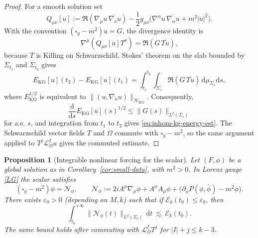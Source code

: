 \documentclass[11pt]{article}
\numberwithin{equation}{section}
\theoremstyle{plain}
\newtheorem{proposition}[theorem]{Proposition}
\theoremstyle{definition}
\theoremstyle{remark}
\newcommand{\dd}{\mathrm{d}}
\begin{document}
\begin{proof}
For a smooth solution set
\begin{equation}
 Q_{\mu\nu}[u]
 :=\Re(\nabla_\mu u\,\overline{\nabla_\nu u})
 -\frac12 g_{\mu\nu}\bigl(\nabla^\alpha u\,\overline{\nabla_\alpha u}+m^2|u|^2\bigr).
\end{equation}
With the convention \((\square_g-m^2)u=G\), the divergence identity is
\begin{equation}
 \nabla^\mu(Q_{\mu\nu}[u]T^\nu)=\Re(G\,\overline{T u}),
\end{equation}
because \(T\) is Killing on Schwarzschild.  Stokes' theorem on the slab bounded by \(\Sigma_{t_1}\) and \(\Sigma_{t_2}\) gives
\begin{equation}
 E_{\mathrm{KG}}[u](t_2)-E_{\mathrm{KG}}[u](t_1)
 =\int_{t_1}^{t_2}\int_{\Sigma_s}\Re(G\,\overline{T u})\,\dd\mu_{\Sigma_s}\dd s,
\end{equation}
where \(E_{\mathrm{KG}}^{1/2}\) is equivalent to \(\|(u,\nabla_nu)\|_{\mathcal H_{\mathrm{KG}}}\).  Consequently,
\begin{equation}
 \frac{\dd}{\dd s}E_{\mathrm{KG}}[u](s)^{1/2}
 \le \|G(s)\|_{L^2(\Sigma_s)}
\end{equation}
for a.e. \(s\), and integration from \(t_1\) to \(t_2\) gives \eqref{eq:inhom-kg-energy-est}.  The Schwarzschild vector fields \(T\) and \(\Omega\) commute with \(\square_g-m^2\), so the same argument applied to \(T^j\mathcal L_\Omega^Iu\) gives the commuted estimate.
\end{proof}

\begin{proposition}[Integrable nonlinear forcing for the scalar]\label{prop:integrable-forcing}
Let $(F,\phi)$ be a global solution as in Corollary~\ref{cor:small-data}, with $m^{2}>0$.
In Lorenz gauge \eqref{LG} the scalar satisfies
\begin{equation}\label{eq:phi-as-kg}
(\square_g-m^{2})\phi = \mathcal N_{\phi},
\qquad
\mathcal N_{\phi}:=2iA^{\mu}\nabla_{\mu}\phi + A^{\mu}A_{\mu}\phi + \bigl(\partial_{\bar\phi}P(\phi,\bar\phi)-m^{2}\phi\bigr).
\end{equation}
There exists $\varepsilon_0>0$ (depending on $M,k$) such that if $\mathcal E_k(t_0)\le\varepsilon_0$, then
\begin{equation}\label{eq:forcing-L1}
\int_{t_0}^{+\infty}\|\mathcal N_{\phi}(t)\|_{L^{2}(\Sigma_t)}\,\dd t
\ \lesssim\ \mathcal E_k(t_0).
\end{equation}
The same bound holds after commuting with $\mathcal L_{\Omega}^{I}T^{j}$ for $|I|+j\le k-3$.
\end{proposition}
\end{document}
